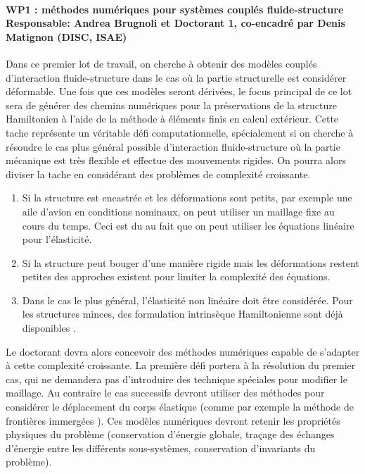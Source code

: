 \documentclass[12pt, french]{article}
\begin{document}
\paragraph{\large WP1 : méthodes numériques pour systèmes couplés fluide-structure\\
Responsable: Andrea Brugnoli et Doctorant 1, co-encadré par Denis Matignon (DISC, ISAE)\\}
 Dans ce premier lot de travail, on cherche à obtenir des modèles couplés d'interaction fluide-structure dans le cas où la partie structurelle est considérer déformable. Une fois que ces modèles seront dérivées, le focus principal de ce lot sera de générer des chemins numériques pour la préservations de la structure Hamiltonien à l'aide de la méthode à éléments finis en calcul extérieur. Cette tache représente un véritable défi computationnelle, spécialement si on cherche à résoudre le cas plus général possible d'interaction fluide-structure où la partie mécanique est très flexible et effectue des mouvements rigides. On pourra alors diviser la tache en considérant des problèmes de complexité croissante. 
\begin{enumerate}
	\item Si la structure est encastrée et les déformations sont petits, par exemple une aile d'avion en conditions nominaux, on peut utiliser un maillage fixe au cours du temps. Ceci est du au fait que on peut utiliser les équations linéaire pour l'élasticité. 
	\item Si la structure peut bouger d'une manière rigide mais les déformations restent petites des approches existent pour limiter la complexité des équations.
	\item Dans le cas le plus général, l'élasticité non linéaire doit être considérée. Pour les structures minces, des formulation intrinsèque Hamiltonienne sont déjà disponibles \cite{hodges2003exact}.
\end{enumerate}
Le doctorant devra alors concevoir des méthodes numériques capable de s'adapter à cette complexité croissante. La première défi portera à la résolution du premier cas, qui ne demandera pas d'introduire des technique spéciales pour modifier le maillage. Au contraire le cas successifs devront utiliser des méthodes pour considérer le déplacement du corps élastique (comme par exemple la méthode de frontières immergées \cite{peskin2002}). Ces modèles numériques devront retenir les propriétés physiques du problème (conservation d'énergie globale, traçage des échanges d'énergie entre les différents sous-systèmes, conservation d'invariants du problème).
\end{document}
